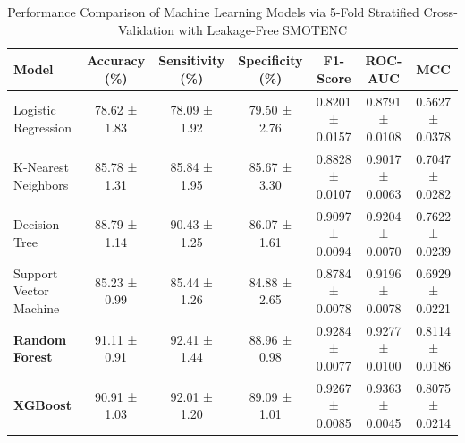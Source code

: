 \begin{table}[htbp]

\centering

\caption{Performance Comparison of Machine Learning Models via 5-Fold Stratified Cross-Validation with Leakage-Free SMOTENC}

\label{tab:model_benchmark}

\begin{tabular}{lcccccc}

\hline

\textbf{Model} & \textbf{Accuracy (\%)} & \textbf{Sensitivity (\%)} & \textbf{Specificity (\%)} & \textbf{F1-Score} & \textbf{ROC-AUC} & \textbf{MCC} \\

\hline

Logistic Regression & 78.62 ± 1.83 & 78.09 ± 1.92 & 79.50 ± 2.76 & 0.8201 ± 0.0157 & 0.8791 ± 0.0108 & 0.5627 ± 0.0378 \\

K-Nearest Neighbors & 85.78 ± 1.31 & 85.84 ± 1.95 & 85.67 ± 3.30 & 0.8828 ± 0.0107 & 0.9017 ± 0.0063 & 0.7047 ± 0.0282 \\

Decision Tree & 88.79 ± 1.14 & 90.43 ± 1.25 & 86.07 ± 1.61 & 0.9097 ± 0.0094 & 0.9204 ± 0.0070 & 0.7622 ± 0.0239 \\

Support Vector Machine & 85.23 ± 0.99 & 85.44 ± 1.26 & 84.88 ± 2.65 & 0.8784 ± 0.0078 & 0.9196 ± 0.0078 & 0.6929 ± 0.0221 \\

\textbf{Random Forest} & 91.11 ± 0.91 & 92.41 ± 1.44 & 88.96 ± 0.98 & 0.9284 ± 0.0077 & 0.9277 ± 0.0100 & 0.8114 ± 0.0186 \\

\textbf{XGBoost} & 90.91 ± 1.03 & 92.01 ± 1.20 & 89.09 ± 1.01 & 0.9267 ± 0.0085 & 0.9363 ± 0.0045 & 0.8075 ± 0.0214 \\

\hline

\end{tabular}

\end{table}

